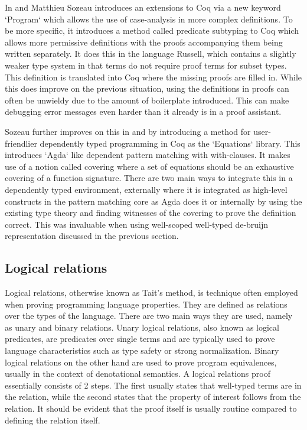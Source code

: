 \documentclass[a4, 12pt, final]{article}
\begin{document}
In \cite{Sozeau2006} and \cite{Sozeau2007} Matthieu Sozeau introduces an extensions to Coq via a new keyword `Program` which allows the use of case-analysis in more complex definitions. To be more specific, it introduces a method called predicate subtyping to Coq which allows more permissive definitions with the proofs accompanying them being written separately. It does this in the language Russell, which contains a slightly weaker type system in that terms do not require proof terms for subset types. This definition is translated into Coq where the missing proofs are filled in. While this does improve on the previous situation, using the definitions in proofs can often be unwieldy due to the amount of boilerplate introduced. This can make debugging error messages even harder than it already is in a proof assistant.


Sozeau further improves on this in \cite{Sozeau2010} and \cite{Sozeau2019} by introducing a method for user-friendlier dependently typed programming in Coq as the `Equations` library. This introduces `Agda` like dependent pattern matching with with-clauses. It makes use of a notion called covering where a set of equations should be an exhaustive covering of a function signature. There are two main ways to integrate this in a dependently typed environment, externally where it is integrated as high-level constructs in the pattern matching core as Agda does it or internally by using the existing type theory and finding witnesses of the covering to prove the definition correct. This was invaluable when using well-scoped well-typed de-bruijn representation discussed in the previous section.


\subsection{Logical relations}

Logical relations, otherwise known as Tait's method, is technique often employed when proving programming language properties\cite{skorstengaard2019introduction}. They are defined as relations over the types of the language. There are two main ways they are used, namely as unary and binary relations. Unary logical relations, also known as logical predicates, are predicates over single terms and are typically used to prove language characteristics such as type safety or strong normalization. Binary logical relations on the other hand are used to prove program equivalences, usually in the context of denotational semantics. A logical relations proof essentially consists of 2 steps. The first usually states that well-typed terms are in the relation, while the second states that the property of interest follows from the relation. It should be evident that the proof itself is usually routine compared to defining the relation itself.
\end{document}
